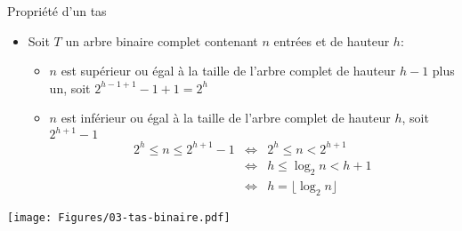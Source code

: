 \begin{frame}{Propriété d'un tas}
\label{03:hauteurtas}
\begin{itemize}
\item Soit $T$ un arbre binaire complet contenant $n$ entrées et de hauteur $h$:
\begin{itemize}
\item $n$ est supérieur ou égal à la taille de l'arbre complet de hauteur $h-1$ plus un, soit $2^{h-1+1}-1+1=2^h$
\item $n$ est inférieur ou égal à la taille de l'arbre complet de hauteur $h$, soit $2^{h+1}-1$
\begin{eqnarray*}
2^h\leq n\leq 2^{h+1}-1 & \Leftrightarrow & 2^h\leq n < 2^{h+1}\\
& \Leftrightarrow & h \leq \log_2 n < h+1 \\
& \Leftrightarrow & h=\lfloor \log_2 n\rfloor
\end{eqnarray*}
\end{itemize}
\end{itemize}

\centerline{\texttt{[image: Figures/03-tas-binaire.pdf]}}

\end{frame}




